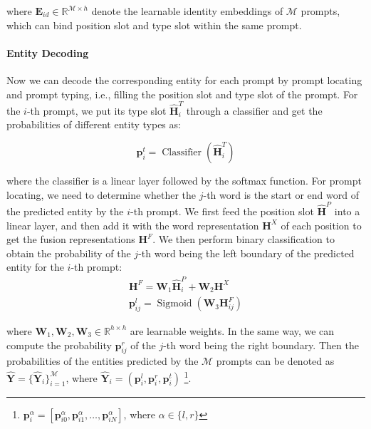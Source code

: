 \documentclass[11pt]{article}
\begin{document}
\noindent where $\mathbf{E}_{id} \in \mathbb{R}^{\mathcal{M}\times h} $ denote the learnable identity embeddings of $\mathcal{M}$ prompts, which can bind position slot and type slot within the same prompt.



\paragraph{Entity Decoding}
Now we can decode the corresponding entity for each prompt by prompt locating and prompt typing, i.e., filling the position slot and type slot of the prompt. For the $i$-th prompt, we put its type slot $\hat{\mathbf{H}}^T_i$ through a classifier and get the probabilities of different entity types as:

\begin{equation*}
    \mathbf{p}^{t}_i = \operatorname{Classifier}\left( \hat{\mathbf{H}}^T_i\right)
\end{equation*}

\noindent where the classifier is a linear layer followed by the softmax function. For prompt locating, we need to determine whether the $j$-th word is the start or end word of the predicted entity by the $i$-th prompt. We first feed the position slot $\hat{\mathbf{H}}^P$ into a linear layer, and then add it with the word representation $\mathbf{H}^X$ of each position to get the fusion representations $\mathbf{H}^{F}$. We then perform binary classification to obtain the probability of the $j$-th word being the left boundary of the predicted entity for the $i$-th prompt:
\begin{align*}
    \mathbf{H}^{F} = \mathbf{W}_1\hat{\mathbf{H}}^P_i+\mathbf{W}_2\mathbf{H}^X \\
    \mathbf{p}^{l}_{ij} = \operatorname{Sigmoid}\left(\mathbf{W}_3\mathbf{H}^{F}_{ij}\right)
\end{align*}

 
\noindent where $\mathbf{W}_1, \mathbf{W}_2, \mathbf{W}_3\in \mathbb{R}^{h\times h}$ are learnable weights. In the same way, we can compute the probability $\mathbf{p}^{r}_{ij}$ of the $j$-th word being the right boundary. Then the probabilities of the entities predicted by the $\mathcal{M}$ prompts can be denoted as $\hat{\mathbf{Y}} = \{\hat{\mathbf{Y}}_{i}\}^\mathcal{M}_{i=1}$, where $\hat{\mathbf{Y}}_{i} = (\mathbf{p}^{l}_{i}, \mathbf{p}^{r}_{i}, \mathbf{p}^{t}_i)$ \footnote{\;$\mathbf{p}^{\alpha }_{i} = \left[\mathbf{p}^{\alpha }_{i0}, \mathbf{p}^{\alpha }_{i1}, \dots, \mathbf{p}^{\alpha }_{iN} \right] $, where $\alpha \in \{l, r\}$}.
\end{document}
